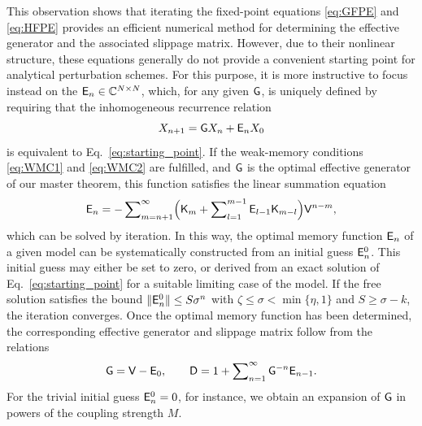 \documentclass[aps,prl,reprint]{revtex4-2}
\begin{document}
This observation shows that iterating the fixed-point equations \eqref{eq:GFPE} and \eqref{eq:HFPE} provides an efficient numerical method for determining the effective generator and the associated slippage matrix.
However, due to their nonlinear structure, these equations generally do not provide a convenient starting point for analytical perturbation schemes.
For this purpose, it is more instructive to focus instead on the $\mathsf{E}_n\in\mathbb{C}^{N\times N}$, which, for any given $\mathsf{G}$, is uniquely defined by requiring that the inhomogeneous recurrence relation
\begin{equation}
	X_{n+1} = \mathsf{G} X_n + \mathsf{E}_n X_0
\end{equation}
is equivalent to Eq.~\eqref{eq:starting_point}.
If the weak-memory conditions \eqref{eq:WMC1} and \eqref{eq:WMC2} are fulfilled, and $\mathsf{G}$ is the optimal effective generator of our master theorem, this function satisfies the linear summation equation
\begin{equation}
	\mathsf{E}_n = -\sum\nolimits_{m=n+1}^\infty\Bigl(
		\mathsf{K}_{m} + \sum\nolimits_{l=1}^{m-1}\mathsf{E}_{l-1}\mathsf{K}_{m-l}\Bigr)\mathsf{V}^{n-m},
\end{equation}
which can be solved by iteration.
In this way, the optimal memory function $\mathsf{E}_n$ of a given model can be systematically constructed from an initial guess $\mathsf{E}^0_n$.
This initial guess may either be set to zero, or derived from an exact solution of Eq.~\eqref{eq:starting_point} for a suitable limiting case of the model.
If the free solution satisfies the bound $\lVert \mathsf{E}^0_n \rVert\leq S\sigma^n$ with $\zeta\leq\sigma<\min\{\eta,1\}$ and $S\geq \sigma -k$, the iteration converges.
Once the optimal memory function has been determined, the corresponding effective generator and slippage matrix follow from the relations
\begin{equation}
\mathsf{G} = \mathsf{V} - \mathsf{E}_0, \qquad
\mathsf{D} = 1 + \sum\nolimits_{n=1}^\infty \mathsf{G}^{-n}\mathsf{E}_{n-1}.
\end{equation}
For the trivial initial guess $\mathsf{E}^0_n = 0$, for instance, we obtain an expansion of $\mathsf{G}$ in powers of the coupling strength $M$.
\end{document}
